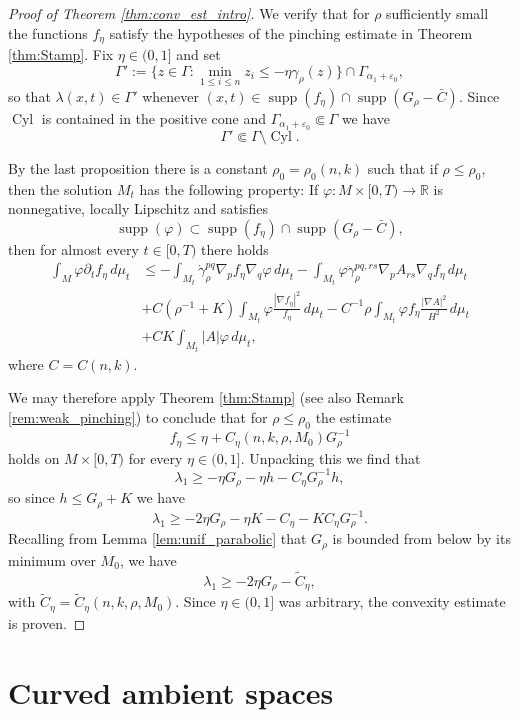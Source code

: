\documentclass[12pt]{amsart}
\DeclareMathOperator{\Cyl}{Cyl}
\DeclareMathOperator{\supp}{supp}
\begin{document}
\begin{proof}[Proof of Theorem \ref{thm:conv_est_intro}]
We verify that for $\rho$ sufficiently small the functions $f_\eta$ satisfy the hypotheses of the pinching estimate in Theorem \ref{thm:Stamp}. Fix $\eta \in (0,1]$ and set
\[\Gamma' := \{z \in \Gamma: \min_{1 \leq i \leq n} z_i \leq - \eta \gamma_\rho(z)\} \cap \Gamma_{\alpha_1 +\varepsilon_0},\]
so that $\lambda(x,t) \in \Gamma'$ whenever $(x,t) \in \supp(f_\eta) \cap \supp(G_\rho -\bar C)$. Since $\Cyl$ is contained in the positive cone and $\Gamma_{\alpha_1 + \varepsilon_0}\Subset \Gamma$ we have 
\[\Gamma' \Subset \Gamma \setminus \Cyl.\]

By the last proposition there is a constant $\rho_0 = \rho_0(n,k)$ such that if $\rho \leq \rho_0$, then the solution $M_t$ has the following property: If $\varphi:M\times[0,T) \to \mathbb{R}$ is nonnegative, locally Lipschitz and satisfies 
\[\supp(\varphi) \subset \supp(f_\eta) \cap \supp(G_\rho - \bar C),\]
then for almost every $t \in [0,T)$ there holds 
\begin{align*}
\int_M \varphi \partial_t f_\eta \, d\mu_t &\leq - \int_{M_t} \dot \gamma_\rho^{pq} \nabla_p f_\eta \nabla_q \varphi\,d\mu_t - \int_{M_t} \varphi \ddot \gamma^{pq,rs}_\rho \nabla_p A_{rs} \nabla_q f_\eta \, d\mu_t \\
& + C(\rho^{-1} + K) \int_{M_t} \varphi \frac{|\nabla f_\eta|^2}{f_\eta} \,d\mu_t - C^{-1} \rho \int_{M_t} \varphi f_\eta \frac{|\nabla A|^2}{H^2} \,d\mu_t \\
&  + CK\int_{M_t} |A|\varphi  \,d\mu_t,
\end{align*}
where $C = C(n,k)$.

We may therefore apply Theorem \ref{thm:Stamp} (see also Remark \ref{rem:weak_pinching}) to conclude that for $\rho \leq \rho_0$ the estimate
\[f_\eta \leq \eta  + C_\eta(n,k,\rho,M_0) G_\rho^{-1}\]
holds on $M\times[0,T)$ for every $\eta \in (0,1]$. Unpacking this we find that 
\[\lambda_1 \geq -\eta G_\rho-\eta h - C_\eta G_\rho^{-1} h,\]
so since $h \leq G_\rho + K$ we have
\[\lambda_1 \geq - 2\eta G_\rho - \eta K - C_\eta - K C_\eta G_\rho^{-1}.\] 
Recalling from Lemma \ref{lem:unif_parabolic} that $G_\rho$ is bounded from below by its minimum over $M_0$, we have 
\[\lambda_1 \geq  - 2 \eta G_\rho- \tilde C_\eta,\]
with $\tilde C_\eta = \tilde C_\eta(n,k,\rho,M_0)$. Since $\eta \in (0,1]$ was arbitrary, the convexity estimate is proven. 
\end{proof}

\section{Curved ambient spaces}
\label{sec:curved_ambient}
\end{document}
